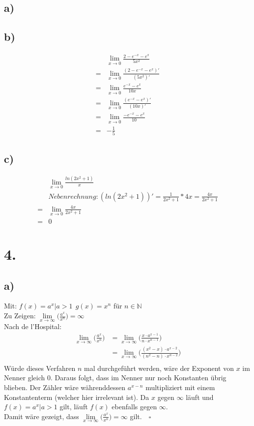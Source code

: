 \documentclass[a4paper]{scrartcl}
\newcommand{\qed}{\quad \square}
\begin{document}
\subsection{a)}
\subsection{b)}
\begin{align}
&\lim_{x\to 0} \frac{2-e^{-x}-e^x}{5x^2} \\
= &\lim_{x\to 0} \frac{(2-e^{-x}-e^x)'}{(5x^2)'} \\
= &\lim_{x\to 0} \frac{e^{-x}-e^x}{10x} \\
= &\lim_{x\to 0} \frac{(e^{-x}-e^x)'}{(10x)'} \\
= &\lim_{x\to 0} \frac{-e^{-x}-e^x}{10} \\
= &-\frac{1}{5}
\end{align}
\subsection{c)}
\begin{align}
&\lim_{x\to 0} \frac {ln(2x^2 + 1)} {x} \\
&Nebenrechnung: (ln(2x^2 + 1))' = \frac{1}{2x^2 + 1} * 4x = \frac{4x}{2x^2 +1} \\
= &\lim_{x\to 0} \frac{4x} {2x^2 + 1} \\
= &0
\end{align}
\newpage
\section{4.}
\subsection{a)}
Mit: \(f(x)=a^x |a>1\ \ g(x)=x^n\) für \(n\in \mathbb{N}\)\\
Zu Zeigen: \(\lim\limits_{x\to\infty}\bigg(\frac{a^x}{x^n}\bigg)=\infty\)\\
Nach de l'Hospital:
\begin{align}
\lim\limits_{x\to\infty}\bigg(\frac{a^x}{x^n}\bigg)&=\lim\limits_{x\to\infty}\bigg(\frac{x\cdot a^{x-1}}{n\cdot x^{n-1}}\bigg)\\
	&=\lim\limits_{x\to\infty}\bigg(\frac{(x^2-x)\cdot a^{x-2}}{(n^2-n)\cdot x^{n-2}}\bigg)\\
\end{align}
Würde dieses Verfahren \(n\) mal durchgeführt werden, wäre der Exponent von \(x\) im Nenner gleich 0. Daraus folgt, dass im Nenner nur noch Konstanten übrig blieben. Der Zähler wäre währenddessen \(a^{x-n}\) multipliziert mit einem Konstantenterm (welcher hier irrelevant ist). Da \(x\) gegen  \(\infty\) läuft und \(f(x)=a^x|a>1\) gilt, läuft \(f(x)\) ebenfalls gegen \(\infty\).\\
Damit wäre gezeigt, dass \(\lim\limits_{x\to\infty}\bigg(\frac{a^x}{x^n}\bigg)=\infty\) gilt.\(\qed\)
\end{document}
